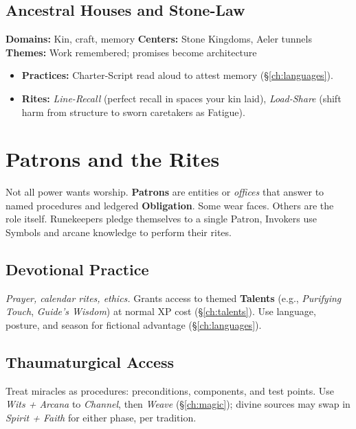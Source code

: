 \subsection*{Ancestral Houses and Stone-Law}
\textbf{Domains:} Kin, craft, memory \quad
\textbf{Centers:} Stone Kingdoms, Aeler tunnels \\
\textbf{Themes:} Work remembered; promises become architecture
\begin{itemize}
  \item \textbf{Practices:} Charter-Script read aloud to attest memory (\S\ref{ch:languages}). 
  \item \textbf{Rites:} \emph{Line-Recall} (perfect recall in spaces your kin laid), \emph{Load-Share} (shift harm from structure to sworn caretakers as Fatigue).
\end{itemize}

\section{Patrons and the Rites}
Not all power wants worship. \textbf{Patrons} are entities or \emph{offices} that answer to named procedures and ledgered \textbf{Obligation}. Some wear faces. Others are the role itself. Runekeepers pledge themselves to a single Patron, Invokers use Symbols and arcane knowledge to perform their rites. 

\subsection*{Devotional Practice}
\emph{Prayer, calendar rites, ethics.} Grants access to themed \textbf{Talents} (e.g., \emph{Purifying Touch}, \emph{Guide's Wisdom}) at normal XP cost (\S\ref{ch:talents}). Use language, posture, and season for fictional advantage (\S\ref{ch:languages}).

\subsection*{Thaumaturgical Access}
Treat miracles as procedures: preconditions, components, and test points. Use \emph{Wits + Arcana} to \emph{Channel}, then \emph{Weave} (\S\ref{ch:magic}); divine sources may swap in \emph{Spirit + Faith} for either phase, per tradition.

